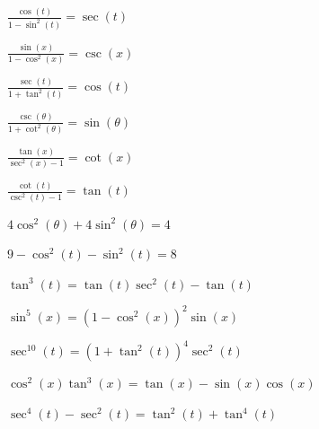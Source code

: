 \documentclass{ximera}
\begin{document}
\begin{question}
\begin{problem}
     $\frac{\cos(t)}{1 - \sin^{2}(t)} = \sec(t)$
\end{problem}

\begin{problem}
    $\frac{\sin(x)}{1 - \cos^{2}(x)} = \csc(x)$
\end{problem}

\begin{problem}
    $\frac{\sec(t)}{1 + \tan^{2}(t)} = \cos(t)$
\end{problem}

\begin{problem}
    $\frac{\csc(\theta)}{1 + \cot^{2}(\theta)} = \sin(\theta)$
\end{problem}

\begin{problem}
    $\frac{\tan(x)}{\sec^{2}(x) - 1} = \cot(x)$
\end{problem}

\begin{problem}
    $\frac{\cot(t)}{\csc^{2}(t) - 1} = \tan(t)$
\end{problem}

\begin{problem}
     $4 \cos^{2}(\theta) + 4 \sin^{2}(\theta) = 4$
\end{problem}

\begin{problem}
    $9 - \cos^{2}(t) - \sin^{2}(t) = 8$
\end{problem}

\begin{problem}
    $\tan^{3}(t) = \tan(t)\sec^{2}(t) - \tan(t)$
\end{problem}

\begin{problem}
    $\sin^{5}(x) = \left(1-\cos^{2}(x)\right)^{2} \sin(x)$
\end{problem}

\begin{problem}
     $\sec^{10}(t) = \left(1 + \tan^{2}(t)\right)^4 \sec^{2}(t)$
\end{problem}

\begin{problem}
    $\cos^{2}(x)\tan^{3}(x) = \tan(x) - \sin(x)\cos(x)$
\end{problem}

\begin{problem}
    $\sec^{4}(t) - \sec^{2}(t) = \tan^{2}(t) + \tan^{4}(t)$
\end{problem}


\end{question}
\end{document}
